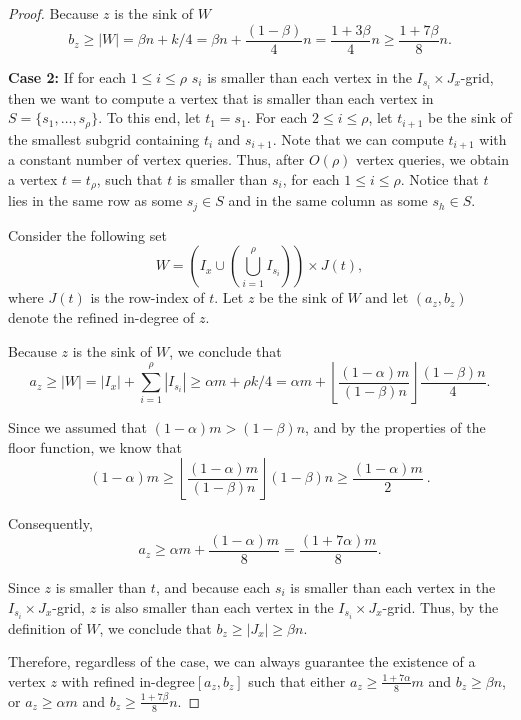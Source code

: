 \documentclass[a4paper,10pt]{article}
\newcommand{\indegree}{refined in-degree\xspace}
\begin{document}
\begin{proof}
Because $z$ is the sink of $W$
 $$b_z \geq |W| = \beta n + k/4 = \beta n + \frac{(1-\beta)}{4}n = \frac{1 + 3\beta}{4}n\geq \frac{1 + 7\beta}{8}n.$$

\textbf{Case 2:} If for each $1\leq i\leq \rho$ $s_i$ is smaller than each vertex in the $I_{s_i}\times J_x$-grid, then we want to compute a vertex that is smaller than each vertex in $S = \{s_1, \ldots, s_\rho\}$.
To this end, let $t_1 = s_1$.
For each $2\leq i\leq \rho$, let $t_{i+1}$ be the sink of the smallest subgrid containing $t_i$ and $s_{i+1}$. Note that we can compute $t_{i+1}$ with a constant number of vertex queries.
Thus, after $O(\rho)$ vertex queries, we obtain a vertex $t = t_\rho$, such that $t$ is smaller than $s_i$, for each $1\leq i\leq \rho$. Notice that $t$ lies in the same row as some $s_j\in S$ and in the same column as some $s_h\in S$. 

Consider the following set $$W = \left(I_x\cup \left(\bigcup_{i=1}^\rho I_{s_i}\right)\right)\times J(t),$$
where $J(t)$ is the row-index of $t$.
Let $z$ be the sink of $W$ and let $(a_z, b_z)$ denote the \indegree of $z$.

Because $z$ is the sink of $W$, we conclude that 
$$a_z \geq |W|  = |I_x| + \sum_{i=1}^\rho |I_{s_i}| \geq
\alpha m + \rho k/4  = \alpha m +  \left\lfloor \frac{(1-\alpha)m}{(1-\beta)n} \right\rfloor \frac{(1-\beta) n}{4}.$$

Since we assumed that $(1 - \alpha) m > (1-\beta) n$, and by the properties of the floor function, we know that $$(1 - \alpha) m \geq \left \lfloor \frac{(1-\alpha)m}{(1-\beta)n} \right \rfloor (1-\beta)n \geq \frac{(1 - \alpha) m}{2} \ .$$

Consequently, 
$$a_z \geq \alpha m + \frac{(1-\alpha)m}{8} = \frac{(1 + 7\alpha) m}{8}.$$

Since $z$ is smaller than $t$, and 
because each $s_i$ is smaller than each vertex in the $I_{s_i}\times J_x$-grid, $z$ is also smaller than each vertex in the $I_{s_i}\times J_x$-grid. Thus, by the definition of $W$, we conclude that $b_z \geq |J_x| \geq \beta n$.

Therefore, regardless of the case, we can always guarantee the existence of a vertex $z$ with \indegree $[a_z,b_z]$ such that either $a_z\geq \frac{1+7\alpha}{8}m$ and $b_z \geq \beta n$, or $a_z \geq \alpha m$ and $b_z \geq \frac{1 + 7\beta}{8}n$.
\end{proof}
\end{document}
